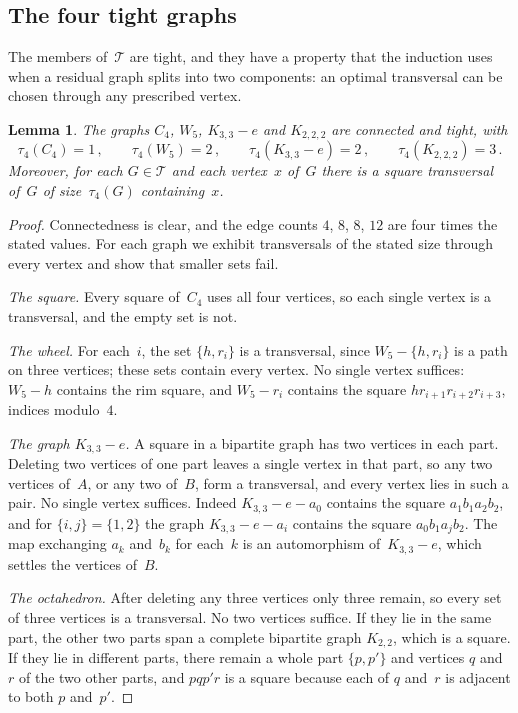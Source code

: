 \documentclass[11pt,letterpaper]{article}
\numberwithin{equation}{section}
\theoremstyle{plain}
\newtheorem{lemma}[theorem]{Lemma}
\theoremstyle{definition}
\theoremstyle{remark}
\newcommand{\Kme}{K_{3,3}-e}
\newcommand{\Oct}{K_{2,2,2}}
\newcommand{\Tfam}{\mathcal{T}}
\begin{document}
\subsection{The four tight graphs}

The members of~$\Tfam$ are tight, and they have a property that the induction uses when a residual graph splits into two components: an optimal transversal can be chosen through any prescribed vertex.

\begin{lemma}\label{lem:small}
The graphs $C_4$, $W_5$, $\Kme$ and $\Oct$ are connected and tight, with
\begin{equation*}
\tau_4(C_4)=1\,,\qquad \tau_4(W_5)=2\,,\qquad \tau_4(\Kme)=2\,,\qquad \tau_4(\Oct)=3\,.
\end{equation*}
Moreover, for each $G\in\Tfam$ and each vertex~$x$ of~$G$ there is a square transversal of~$G$ of size~$\tau_4(G)$ containing~$x$.
\end{lemma}

\begin{proof}
Connectedness is clear, and the edge counts $4$, $8$, $8$, $12$ are four times the stated values. For each graph we exhibit transversals of the stated size through every vertex and show that smaller sets fail.

\emph{The square.} Every square of~$C_4$ uses all four vertices, so each single vertex is a transversal, and the empty set is not.

\emph{The wheel.} For each~$i$, the set $\{h,r_i\}$ is a transversal, since $W_5-\{h,r_i\}$ is a path on three vertices; these sets contain every vertex. No single vertex suffices: $W_5-h$ contains the rim square, and $W_5-r_i$ contains the square $hr_{i+1}r_{i+2}r_{i+3}$, indices modulo~$4$.

\emph{The graph $\Kme$.} A square in a bipartite graph has two vertices in each part. Deleting two vertices of one part leaves a single vertex in that part, so any two vertices of~$A$, or any two of~$B$, form a transversal, and every vertex lies in such a pair. No single vertex suffices. Indeed $\Kme-a_0$ contains the square $a_1b_1a_2b_2$, and for $\{i,j\}=\{1,2\}$ the graph $\Kme-a_i$ contains the square $a_0b_1a_jb_2$. The map exchanging $a_k$ and~$b_k$ for each~$k$ is an automorphism of~$\Kme$, which settles the vertices of~$B$.

\emph{The octahedron.} After deleting any three vertices only three remain, so every set of three vertices is a transversal. No two vertices suffice. If they lie in the same part, the other two parts span a complete bipartite graph $K_{2,2}$, which is a square. If they lie in different parts, there remain a whole part $\{p,p'\}$ and vertices $q$ and~$r$ of the two other parts, and $pqp'r$ is a square because each of $q$ and~$r$ is adjacent to both $p$ and~$p'$.
\end{proof}
\end{document}
